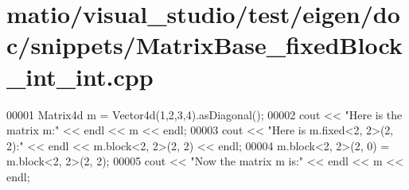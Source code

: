 \hypertarget{matio_2visual__studio_2test_2eigen_2doc_2snippets_2_matrix_base__fixed_block__int__int_8cpp_source}{}\section{matio/visual\+\_\+studio/test/eigen/doc/snippets/\+Matrix\+Base\+\_\+fixed\+Block\+\_\+int\+\_\+int.cpp}
\label{matio_2visual__studio_2test_2eigen_2doc_2snippets_2_matrix_base__fixed_block__int__int_8cpp_source}

\begin{DoxyCode}
00001 Matrix4d m = Vector4d(1,2,3,4).asDiagonal();
00002 cout << \textcolor{stringliteral}{"Here is the matrix m:"} << endl << m << endl;
00003 cout << \textcolor{stringliteral}{"Here is m.fixed<2, 2>(2, 2):"} << endl << m.block<2, 2>(2, 2) << endl;
00004 m.block<2, 2>(2, 0) = m.block<2, 2>(2, 2);
00005 cout << \textcolor{stringliteral}{"Now the matrix m is:"} << endl << m << endl;
\end{DoxyCode}
